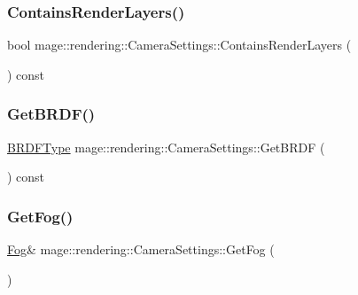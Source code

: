 \hypertarget{classmage_1_1rendering_1_1_camera_settings_aa6a33e3b5936e440af32d2ca3d65585f}{}\label{classmage_1_1rendering_1_1_camera_settings_aa6a33e3b5936e440af32d2ca3d65585f} 
\subsubsection{\texorpdfstring{Contains\+Render\+Layers()}{ContainsRenderLayers()}}
{\footnotesize\ttfamily bool mage\+::rendering\+::\+Camera\+Settings\+::\+Contains\+Render\+Layers (\begin{DoxyParamCaption}{ }\end{DoxyParamCaption}) const\hspace{0.3cm}{\ttfamily [noexcept]}}

\hypertarget{classmage_1_1rendering_1_1_camera_settings_a0339c90a08f8f556a8d82b1b6992e2bb}{}\label{classmage_1_1rendering_1_1_camera_settings_a0339c90a08f8f556a8d82b1b6992e2bb} 
\subsubsection{\texorpdfstring{Get\+B\+R\+D\+F()}{GetBRDF()}}
{\footnotesize\ttfamily \hyperlink{namespacemage_1_1rendering_a13c5e70586af4ce254146074ec055bf6}{B\+R\+D\+F\+Type} mage\+::rendering\+::\+Camera\+Settings\+::\+Get\+B\+R\+DF (\begin{DoxyParamCaption}{ }\end{DoxyParamCaption}) const\hspace{0.3cm}{\ttfamily [noexcept]}}

\hypertarget{classmage_1_1rendering_1_1_camera_settings_a47b2b9eeca9d9eec61a7e290e1abfa43}{}\label{classmage_1_1rendering_1_1_camera_settings_a47b2b9eeca9d9eec61a7e290e1abfa43} 
\subsubsection{\texorpdfstring{Get\+Fog()}{GetFog()}\hspace{0.1cm}{\footnotesize\ttfamily [1/2]}}
{\footnotesize\ttfamily \hyperlink{classmage_1_1rendering_1_1_fog}{Fog}\& mage\+::rendering\+::\+Camera\+Settings\+::\+Get\+Fog (\begin{DoxyParamCaption}{ }\end{DoxyParamCaption})\hspace{0.3cm}{\ttfamily [noexcept]}}

